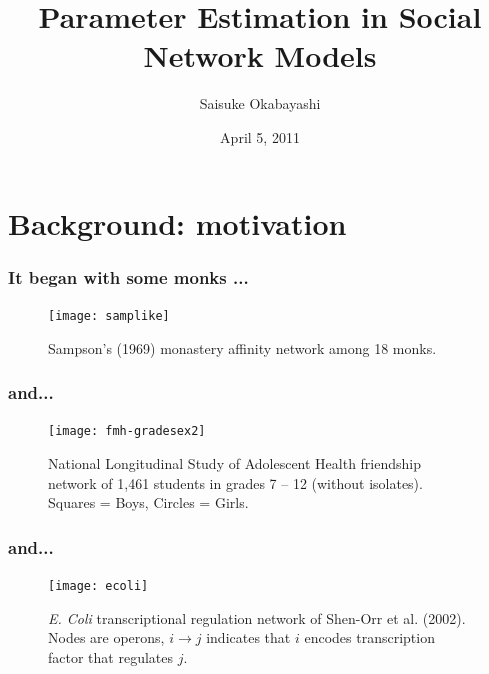 \documentclass[ 10pt]{beamer}
\title{Parameter Estimation in Social Network Models}
\author{
  Saisuke Okabayashi 
}
\institute{Department of Statistics \\ University of Minnesota}
\date{April 5, 2011}
\begin{document}

\frame{\titlepage}
\section{Background: motivation}


\frame
{
  \frametitle{It began with some monks ...}
\begin{figure}
\begin{center} 
\texttt{[image: samplike]}
\caption{Sampson's (1969) monastery affinity network among 18 monks.} 
\end{center} 
\end{figure}
}
%
\frame
{
  \frametitle{and... }
\begin{figure}
\begin{center} 
\texttt{[image: fmh-gradesex2]}
\caption{National Longitudinal Study of Adolescent Health friendship network of 1,461 students in grades 7 -- 12 (without isolates).  Squares = Boys, Circles = Girls.} 
\end{center} 
\label{fmh} 
\end{figure}
}
\frame
{
  \frametitle{and...}

\begin{figure}
\begin{center} 
\texttt{[image: ecoli]}
\caption{\textit{E. Coli} transcriptional regulation network of Shen-Orr et al. (2002).  
Nodes are operons, $i \to j$ indicates that $i$ encodes transcription factor that regulates $j$.} 
\end{center} 
\end{figure}
}
\end{document}
